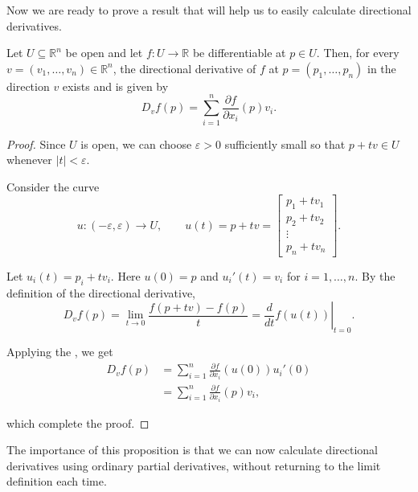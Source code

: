 Now we are ready to prove a result that will help us to easily calculate directional derivatives.

\begin{proposition}\label{prop:review-on-multivariable-calculus-continuation-1}
	Let $U\subseteq\mathbb{R}^n$ be open and let $f:U\to\mathbb{R}$ be differentiable at $p\in U$. Then, for every $v=(v_1,\ldots,v_n)\in\mathbb{R}^n$, the directional derivative of $f$ at $p = (p_1, \ldots, p_n)$ in the direction $v$ exists and is given by
	\begin{equation}
		D_vf(p) = \sum_{i=1}^n \frac{\partial f}{\partial x_i}(p)v_i.
		\label{eq:directional-derivative-characterisation}
	\end{equation}
\end{proposition}

\begin{proof}
	Since $U$ is open, we can choose $\varepsilon>0$ sufficiently small so that $p+tv\in U$ whenever $|t|<\varepsilon$.

	Consider the curve
	\[
		u:(-\varepsilon,\varepsilon)\to U,
		\qquad u(t) = p + tv = \begin{bmatrix} p_1 + t v_1 \\ p_2 + t v_2 \\ \vdots \\ p_n + t v_n \end{bmatrix} .
	\]

	Let \( u_i(t) = p_i + t v_i \). Here $u(0)=p$ and \( u_i'(t) = v_i \) for \( i = 1, \ldots, n \). By the definition of the directional derivative,
	\[
		D_vf(p) = \lim_{t\to 0} \frac{f(p+tv)-f(p)}{t} = \left. \frac{d}{dt}f(u(t))\right|_{t=0}.
	\]

	Applying the , we get
	\[
		\begin{aligned}
			D_vf(p)
			 & =\sum_{i=1}^n \frac{\partial f}{\partial x_i}(u(0))u_i'(0) \\
			 & =\sum_{i=1}^n \frac{\partial f}{\partial x_i}(p)v_i,
		\end{aligned}
	\]

	which complete the proof.
\end{proof}

The importance of this proposition is that we can now
calculate directional derivatives using ordinary partial
derivatives, without returning to the limit definition
each time.

